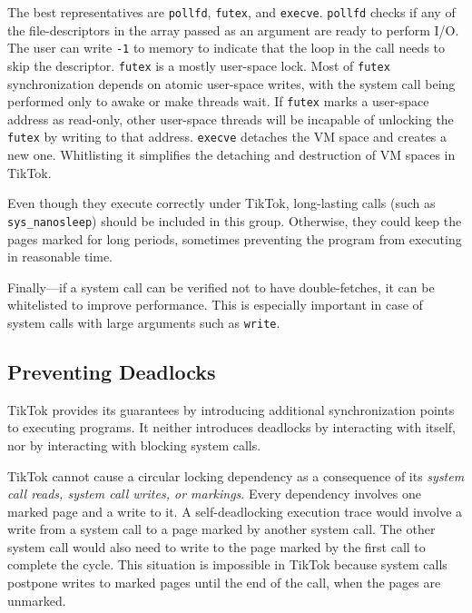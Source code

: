 \documentclass[conference]{IEEEtran}
\newcommand{\sysname}{TikTok}
\begin{document}
The best representatives are \texttt{pollfd}, \texttt{futex}, and
\texttt{execve}. \texttt{pollfd} checks if any of the file-descriptors in the
array passed as an argument are ready to perform I/O. The user can write
\texttt{-1} to memory to indicate that the loop in the call needs to skip the
descriptor. \texttt{futex} is a mostly user-space lock. Most of \texttt{futex}
synchronization depends on atomic user-space writes, with the system call being
performed only to awake or make threads wait. If \texttt{futex} marks a
user-space address as read-only, other user-space threads will be incapable of
unlocking the \texttt{futex} by writing to that address. \texttt{execve}
detaches the VM space and creates a new one. Whitlisting it
simplifies the detaching and destruction of VM spaces in \sysname{}.

Even though they execute correctly under \sysname{}, long-lasting calls (such as
\texttt{sys\_nanosleep}) should be included in this group. Otherwise, they could
keep the pages marked for long periods, sometimes preventing the program from
executing in reasonable time.

Finally---if a system call can be verified not to have double-fetches, it can
be whitelisted to improve performance. This is especially important in case of
system calls with large arguments such as \texttt{write}.

\subsection{Preventing Deadlocks}
\label{subsec:deadlocks}

\sysname{} provides its guarantees by introducing additional synchronization
points to executing programs. It neither introduces deadlocks
by interacting with itself, nor
by interacting with blocking system calls.

\sysname{} cannot cause a circular locking dependency as a consequence of its
\emph{system call reads, system call writes, or markings}. Every dependency
involves one marked page and a write to it. A self-deadlocking execution trace
would involve a write from a system call to a page marked by another
system call. The other system call would also need to write to the page marked
by the first call to complete the cycle. This situation is impossible in
\sysname{} because system calls postpone writes to marked pages until the end of
the call, when the pages are unmarked.
\end{document}
